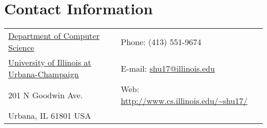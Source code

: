 \section{\sc Contact Information}
\vspace{.05in}
\begin{tabular}{@{}p{3in}p{4in}}
{\href{http://www.cs.illinois.edu/}{Department of Computer Science}}                     & {Phone:}  (413) 551-9674 \\
{\href{http://www.illinois.edu/}{University of Illinois at Urbana-Champaign}}            & {E-mail:} {\href{mailto:shu17@illinois.edu}{shu17@illinois.edu}}\\
201 N Goodwin Ave.                                                                                 & {Web:} {\url{http://www.cs.illinois.edu/~shu17/}}\\
Urbana, IL 61801 USA
\end{tabular}



